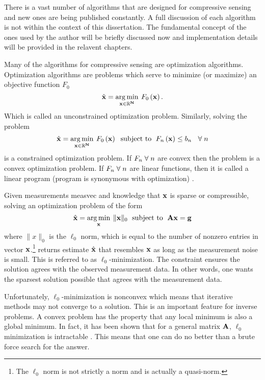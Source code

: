 There is a vast number of algorithms that are designed for compressive sensing and new ones are being published constantly. A full discussion of each algorithm is not within the context of this dissertation. The fundamental concept of the ones used by the author will be briefly discussed now and implementation details will be provided in the relavent chapters. 

Many of the algorithms for compressive sensing are optimization algorithms. Optimization algorithms are problems which serve to minimize (or maximize) an objective function $F_0$
%
\begin{equation}
	\hat{ \mathbf{x} } = \operatorname*{arg\,min}_{\mathbf{x \in \mathbb{R}^N }} \: F_0 \left( \mathbf{x} \right).
\end{equation}
%
Which is called an unconstrained optimization problem. Similarly, solving the problem
%
\begin{equation}
	\hat{ \mathbf{x} } = \operatorname*{arg\,min}_{\mathbf{x \in \mathbb{R}^N }} \: F_0 \left( \mathbf{x} \right) \text{\; subject to \;} F_n \left( \mathbf{x} \right) \leq b_n \text{\; \;}\forall \text{\;} n
\end{equation}
%
is a constrained optimization problem. If $F_n \text{\;}\forall \text{\;} n$ are convex then the problem is a convex optimization problem. If  $F_n \text{\;}\forall \text{\;}n$ are linear functions, then it is called a linear program (program is synonymous with optimization) \cite{foucart2013mathematical}.

Given measurements \gls{measvec} and knowledge that $\mathbf{x}$ is sparse or compressible, solving an optimization problem of the form 
\begin{equation}
	\hat{ \mathbf{x} } = \operatorname*{arg\,min}_{\mathbf{x}} \: \| \mathbf{x} \|_{0} \text{\; subject to \;} \mathbf{A}\mathbf{x} = \mathbf{g}
	\label{eq:l0min}
\end{equation}
where $\| x \|_{0}$ is the $\ell_0$ norm, which is equal to the number of nonzero entries in vector $\mathbf{x}$.\footnote{The $\ell_0$ norm is not strictly a norm and is actually a quasi-norm.}  returns estimate $\hat{ \mathbf{x} }$ that resembles $\mathbf{x}$ as long as the measurement noise is small. This is referred to as $\ell_0$-minimization. The constraint ensures the solution agrees with the observed measurement data. In other words, one wants the sparsest solution possible that agrees with the measurement data. 

Unfortunately, $\ell_0$-minimization is nonconvex which means that iterative methods may not converge to a solution. This is an important feature for inverse problems. A convex problem has the property that any local minimum is also a global minimum. In fact, it has been shown that for a general matrix $\mathbf{A}$, $\ell_0$ minimization is intractable \cite{aggarwal2007data}. This means that one can do no better than a brute force search for the answer.

